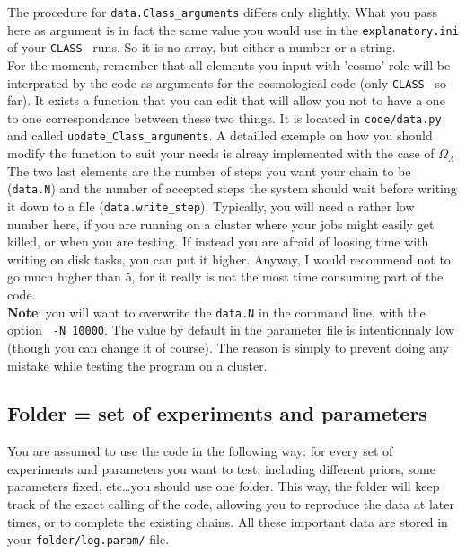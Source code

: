 \documentclass[10pt]{article}
\newcommand{\CLASS}{\texttt{CLASS}}
\begin{document}
  The procedure for \verb?data.Class_arguments? differs only slightly. What you
  pass here as argument is in fact the same value you would use in the
  \verb?explanatory.ini? of your \CLASS~ runs. So it is no array, but either a
  number or a string.\\

  For the moment, remember that all elements you input with 'cosmo' role will
  be interprated by the code as arguments for the cosmological code (only
  \CLASS~ so far). It exists a function that you can edit that will allow you
  not to have a one to one correspondance between these two things. It is
  located in \verb?code/data.py? and called \verb?update_Class_arguments?. A
  detailled exemple on how you should modify the function to suit your needs is
  alreay implemented with the case of $\Omega_{\Lambda}$\\

  The two last elements are the number of steps you want your chain to be
  (\verb?data.N?) and the number of accepted steps the system should wait
  before writing it down to a file (\verb?data.write_step?). Typically, you
  will need a rather low number here, if you are running on a cluster where
  your jobs might easily get killed, or when you are testing. If instead you
  are afraid of loosing time with writing on disk tasks, you can put it higher.
  Anyway, I would recommend not to go much higher than 5, for it really is not
  the most time consuming part of the code.\\

  {\bf Note}: you will want to overwrite the \verb?data.N? in the command line,
  with the option \verb? -N 10000?. The value by default in the parameter file
  is intentionnaly low (though you can change it of course). The reason is
  simply to prevent doing any mistake while testing the program on a cluster.

  \subsection{Folder = set of experiments and parameters}
  
  You are assumed to use the code in the following way: for every set of
  experiments and parameters you want to test, including different priors, some
  parameters fixed, etc\ldots you should use one folder. This way, the folder
  will keep track of the exact calling of the code, allowing you to reproduce
  the data at later times, or to complete the existing chains. All these
  important data are stored in your \verb?folder/log.param/? file.\\
\end{document}
